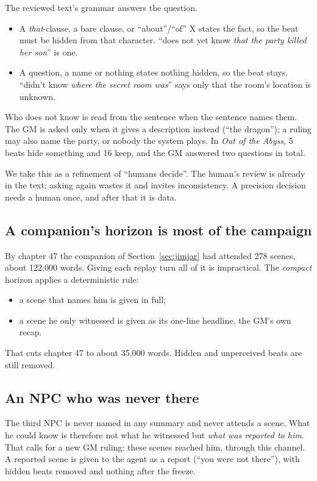 \documentclass[11pt]{article}
\begin{document}
The reviewed text's grammar answers the question.
\begin{itemize}[nosep]
\item A \emph{that}-clause, a bare clause, or ``about''/``of'' X states the fact, so the
beat must be hidden from that character. ``does not yet know \emph{that the party
killed her son}'' is one.
\item A question, a name or nothing states nothing hidden, so the beat stays. ``didn't
know \emph{where the secret room was}'' says only that the room's location is
unknown.
\end{itemize}
Who does not know is read from the sentence when the sentence names them. The GM is
asked only when it gives a description instead (``the dragon''); a ruling may also
name the party, or nobody the system plays. In \emph{Out of the Abyss}, 5 beats hide
something and 16 keep, and the GM answered two questions in total.

We take this as a refinement of ``humans decide''. The human's review is already in
the text; asking again wastes it and invites inconsistency. A precision decision needs
a human once, and after that it is data.

\subsection{A companion's horizon is most of the campaign}

By chapter 47 the companion of Section~\ref{sec:jimjar} had attended 278 scenes, about
122{,}000 words. Giving each replay turn all of it is impractical. The \emph{compact}
horizon applies a deterministic rule:
\begin{itemize}[nosep]
\item a scene that names him is given in full;
\item a scene he only witnessed is given as its one-line headline, the GM's own recap.
\end{itemize}
That cuts chapter 47 to about 35{,}000 words. Hidden and unperceived beats are still
removed.

\subsection{An NPC who was never there}

The third NPC is never named in any summary and never attends a scene. What he could
know is therefore not what he witnessed but \emph{what was reported to him}. That calls
for a new GM ruling: these scenes reached him, through this channel. A reported scene
is given to the agent as a report (``you were not there''), with hidden beats removed
and nothing after the freeze.
\end{document}
